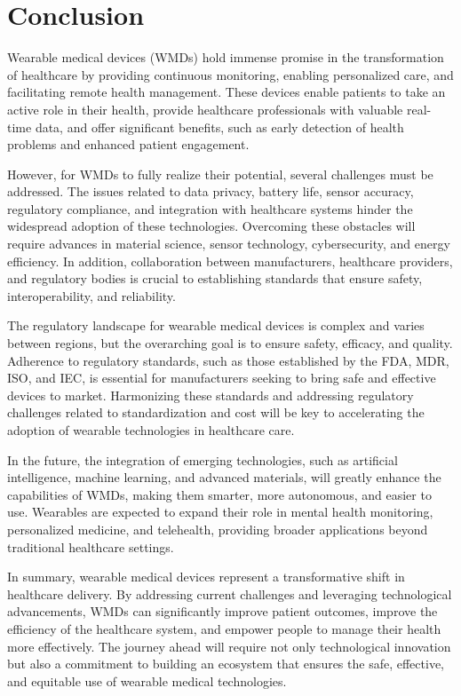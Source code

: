 \documentclass[journal]{IEEEtran}
\begin{document}
\section{Conclusion}
\label{10.Conclusion}

Wearable medical devices (WMDs) hold immense promise in the transformation of healthcare by providing continuous monitoring, enabling personalized care, and facilitating remote health management. These devices enable patients to take an active role in their health, provide healthcare professionals with valuable real-time data, and offer significant benefits, such as early detection of health problems and enhanced patient engagement.

However, for WMDs to fully realize their potential, several challenges must be addressed. The issues related to data privacy, battery life, sensor accuracy, regulatory compliance, and integration with healthcare systems hinder the widespread adoption of these technologies. Overcoming these obstacles will require advances in material science, sensor technology, cybersecurity, and energy efficiency. In addition, collaboration between manufacturers, healthcare providers, and regulatory bodies is crucial to establishing standards that ensure safety, interoperability, and reliability.

The regulatory landscape for wearable medical devices is complex and varies between regions, but the overarching goal is to ensure safety, efficacy, and quality. Adherence to regulatory standards, such as those established by the FDA, MDR, ISO, and IEC, is essential for manufacturers seeking to bring safe and effective devices to market. Harmonizing these standards and addressing regulatory challenges related to standardization and cost will be key to accelerating the adoption of wearable technologies in healthcare care.

In the future, the integration of emerging technologies, such as artificial intelligence, machine learning, and advanced materials, will greatly enhance the capabilities of WMDs, making them smarter, more autonomous, and easier to use. Wearables are expected to expand their role in mental health monitoring, personalized medicine, and telehealth, providing broader applications beyond traditional healthcare settings.

In summary, wearable medical devices represent a transformative shift in healthcare delivery. By addressing current challenges and leveraging technological advancements, WMDs can significantly improve patient outcomes, improve the efficiency of the healthcare system, and empower people to manage their health more effectively. The journey ahead will require not only technological innovation but also a commitment to building an ecosystem that ensures the safe, effective, and equitable use of wearable medical technologies.
\end{document}
